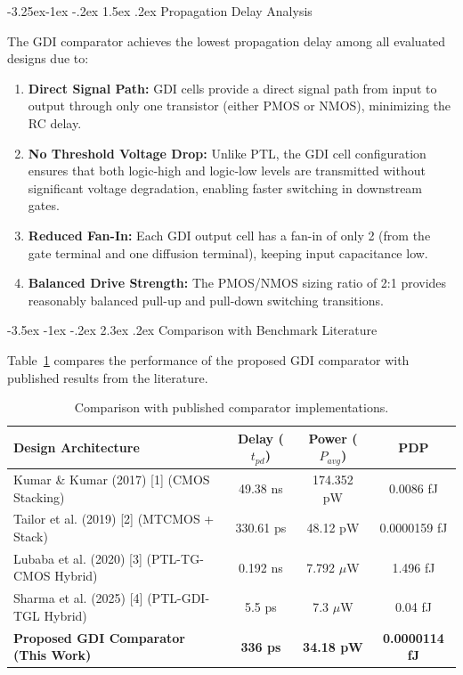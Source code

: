 \documentclass[12pt,a4paper,oneside]{report}
\makeatletter
\renewcommand\section{\@startsection {section}{1}{\z@}%
                                   {-3.5ex \@plus -1ex \@minus -.2ex}%
                                   {2.3ex \@plus.2ex}%
                                   {\normalfont\normalsize\bfseries}}
\renewcommand\subsection{\@startsection{subsection}{2}{\z@}%
                                     {-3.25ex\@plus -1ex \@minus -.2ex}%
                                     {1.5ex \@plus .2ex}%
                                     {\normalfont\normalsize\bfseries\itshape}}
\makeatother
\begin{document}
\subsection{Propagation Delay Analysis}

The GDI comparator achieves the lowest propagation delay among all evaluated designs due to:
\begin{enumerate}
\item \textbf{Direct Signal Path:} GDI cells provide a direct signal path from input to output through only one transistor (either PMOS or NMOS), minimizing the RC delay.
\item \textbf{No Threshold Voltage Drop:} Unlike PTL, the GDI cell configuration ensures that both logic-high and logic-low levels are transmitted without significant voltage degradation, enabling faster switching in downstream gates.
\item \textbf{Reduced Fan-In:} Each GDI output cell has a fan-in of only 2 (from the gate terminal and one diffusion terminal), keeping input capacitance low.
\item \textbf{Balanced Drive Strength:} The PMOS/NMOS sizing ratio of 2:1 provides reasonably balanced pull-up and pull-down switching transitions.
\end{enumerate}

\section{Comparison with Benchmark Literature}

Table~\ref{tab:res_lit_bench_final} compares the performance of the proposed GDI comparator with published results from the literature.

\begin{table}[H]
\centering
\caption{Comparison with published comparator implementations.}
\label{tab:res_lit_bench_final}
\vspace{0.2cm}
\begin{tabular}{|p{5.5cm}|c|c|c|}
\hline
\textbf{Design Architecture} & \textbf{Delay ($t_{pd}$)} & \textbf{Power ($P_{avg}$)} & \textbf{PDP} \\
\hline
Kumar \& Kumar (2017) [1] (CMOS Stacking) & 49.38 ns & 174.352 pW & 0.0086 fJ \\
\hline
Tailor et al. (2019) [2] (MTCMOS + Stack) & 330.61 ps & 48.12 pW & 0.0000159 fJ \\
\hline
Lubaba et al. (2020) [3] (PTL-TG-CMOS Hybrid) & 0.192 ns & 7.792 $\mu$W & 1.496 fJ \\
\hline
Sharma et al. (2025) [4] (PTL-GDI-TGL Hybrid) & 5.5 ps & 7.3 $\mu$W & 0.04 fJ \\
\hline
\textbf{Proposed GDI Comparator (This Work)} & \textbf{336 ps} & \textbf{34.18 pW} & \textbf{0.0000114 fJ} \\
\hline
\end{tabular}
\end{table}
\end{document}
